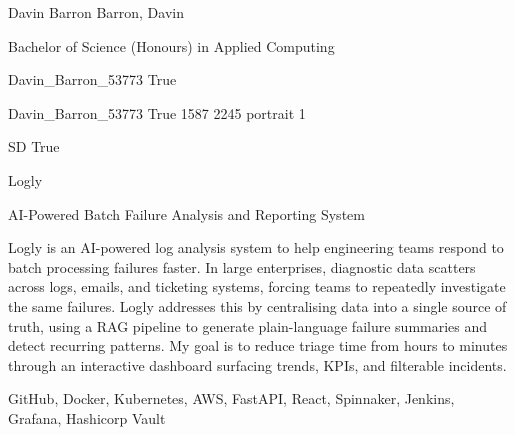 \documentclass[twoside]{report}
\begin{document}
\begingroup{}\relax



\def\Key{Davin_Barron_53773}

{Davin Barron}
{Barron, Davin}

{Bachelor of Science (Honours) in Applied Computing}

{Davin_Barron_53773}
{True}

{Davin_Barron_53773}
{True}
{1587}
{2245}
{portrait}
{1}

{SD}
{True}

{Logly}

{AI-Powered Batch Failure Analysis and Reporting System}

{Logly is an AI-powered log analysis system to help engineering teams respond to batch processing failures faster. In large enterprises, diagnostic data scatters across logs, emails, and ticketing systems, forcing teams to repeatedly investigate the same failures. Logly addresses this by centralising data into a single source of truth, using a RAG pipeline to generate plain-language failure summaries and detect recurring patterns. My goal is to reduce triage time from hours to minutes through an interactive dashboard surfacing trends, KPIs, and filterable incidents.}

{GitHub, Docker, Kubernetes, AWS, FastAPI, React, Spinnaker, Jenkins, Grafana, Hashicorp Vault}
\end{document}
